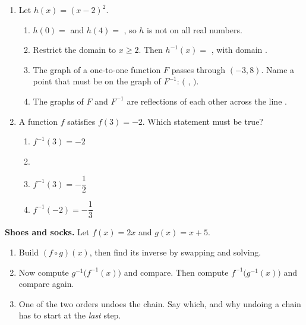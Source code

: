 \documentclass[10pt]{article}
\begin{document}
\begin{enumerate}[itemsep=10pt]
\item Let $h(x) = (x - 2)^2$.

\begin{enumerate}[label=(\alph*), itemsep=5pt]
  \item $h(0) = $  and $h(4) = $ , so $h$ is not
         on all real numbers.
  \item Restrict the domain to $x \ge 2$. Then
        $h^{-1}(x) = $ , with domain .
  \item The graph of a one-to-one function $F$ passes through $(-3, 8)$.
        Name a point that must be on the graph of $F^{-1}$:
        $($  ,  $)$.
  \item The graphs of $F$ and $F^{-1}$ are reflections of each other across the
        line .
\end{enumerate}

\item A function $f$ satisfies $f(3) = -2$. Which statement must be true?

\begin{enumerate}[label=\Alph*., itemsep=3pt]
  \item $f^{-1}(3) = -2$
  \item {}
  \item $f^{-1}(3) = -\dfrac{1}{2}$
  \item $f^{-1}(-2) = -\dfrac{1}{3}$
\end{enumerate}

\end{enumerate}

\vspace{0.1in}

\boxguard
\begin{extensionbox}
\textbf{Shoes and socks.} Let $f(x) = 2x$ and $g(x) = x + 5$.

\begin{enumerate}[label=(\alph*), itemsep=4pt]
  \item Build $(f \circ g)(x)$, then find its inverse by swapping and solving.
  \item Now compute $g^{-1}\big(f^{-1}(x)\big)$ and compare. Then compute
        $f^{-1}\big(g^{-1}(x)\big)$ and compare again.
  \item One of the two orders undoes the chain. Say which, and why undoing a
        chain has to start at the \textit{last} step.
\end{enumerate}

\vspace{0.05in}
\end{extensionbox}
\end{document}
